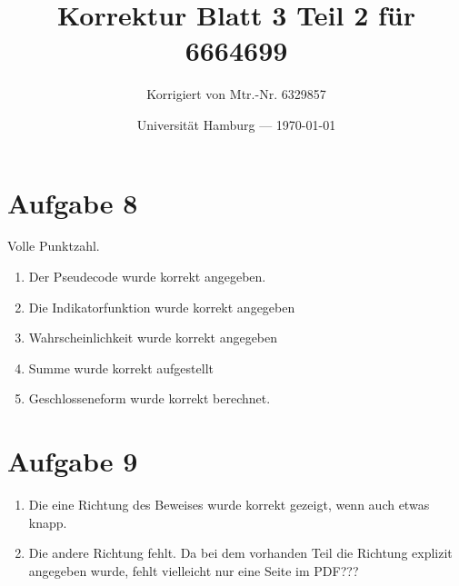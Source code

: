 \documentclass[parskip=half,a4paper]{scrartcl}
\title{Korrektur Blatt 3 Teil 2 für 6664699}
\author{Korrigiert von Mtr.-Nr. 6329857}
\date{Universität Hamburg --- \today}
\begin{document}
\maketitle %

\section{Aufgabe 8}

Volle Punktzahl.

\begin{enumerate}
    \item Der Pseudecode wurde korrekt angegeben.
    \item Die Indikatorfunktion wurde korrekt angegeben
    \item Wahrscheinlichkeit wurde korrekt angegeben
    \item Summe wurde korrekt aufgestellt
    \item Geschlosseneform wurde korrekt berechnet.
\end{enumerate}

\section{Aufgabe 9}

\begin{enumerate}
    \item Die eine Richtung des Beweises wurde korrekt gezeigt, wenn auch etwas knapp.
    \item Die andere Richtung fehlt. Da bei dem vorhanden Teil die Richtung explizit angegeben wurde, fehlt vielleicht nur eine Seite im PDF???
\end{enumerate}
\end{document}
